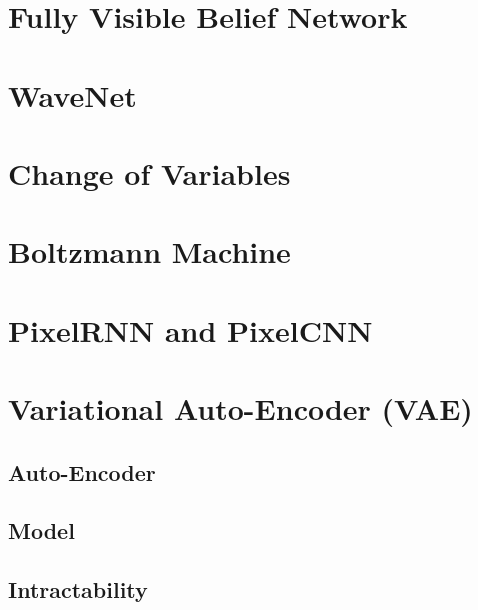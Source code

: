 	\section{Fully Visible Belief Network} %

	\section{WaveNet} %

	\section{Change of Variables} %

	\section{Boltzmann Machine} %

	\section{PixelRNN and PixelCNN} %

	\section{Variational Auto-Encoder (VAE)} %

		\subsection{Auto-Encoder} %

		\subsection{Model} %

		\subsection{Intractability} %

